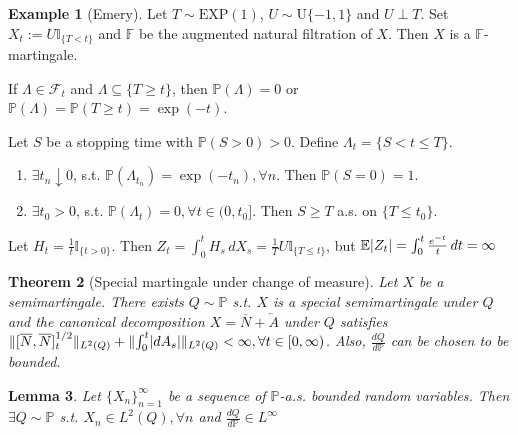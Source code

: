 \documentclass[openany,oneside]{book}
\newtheorem{thm}{Theorem}[section]
\newtheorem{lem}[thm]{Lemma}
\theoremstyle{definition}
\newtheorem{eg}[thm]{Example}
\theoremstyle{remark}
\newcommand{\E}{\mathbb{E}} %
\renewcommand{\P}{\mathbb{P}} %
\newcommand{\I}{\mathbb{I}} %
\DeclarePairedDelimiter{\abs}{\lvert}{\rvert} %
\DeclarePairedDelimiter{\norm}{\lVert}{\rVert} %
\begin{document}
\begin{eg}[Emery]
Let $T\sim \mathrm{EXP}(1)$, $U\sim \mathrm{U}\{-1,1\}$ and $U\perp T$. Set $X_t :=U\I_{\{T< t\}}$ and $\mathbb{F}$ be the augmented natural filtration of $X$. Then $X$ is a $\mathbb{F}$-martingale.
\par
If $\Lambda \in \mathcal{F}_t$ and $\Lambda \subseteq \{T\ge t\}$, then $\P(\Lambda) =0$ or $\P(\Lambda)=\P(T\ge t) = \exp(-t)$.
\par
Let $S$ be a stopping time with $\P(S>0)>0$. Define $\Lambda_t = \{S<t\le T\}$.
\begin{enumerate}
\item $\exists t_n \downarrow 0$, s.t. $\P(\Lambda_{t_n}) = \exp(-t_n), \forall n$. Then $\P(S=0)=1$.
\item $\exists t_0 >0$, s.t. $\P(\Lambda_{t}) = 0, \forall t\in(0,t_0]$. Then $S\ge T$ a.s. on $\{T\le t_0\}$.
\end{enumerate}
\par
Let $H_t = \frac{1}{t}\I_{\{t>0\}}$. Then $Z_t = \int_0^t H_s \,d X_s = \frac{1}{T}U\I_{\{T\le t\}}$, but $\E\abs{Z_t} = \int_0^t \frac{e^{-t}}{t}\,d t = \infty$

\end{eg}

\begin{thm}[Special martingale under change of measure] \label{special}
Let $X$ be a semimartingale. There exists $Q\sim \P$ s.t. $X$ is a special semimartingale under $Q$ and the canonical decomposition $X=\overline{N}+\overleftarrow{A}$ under $Q$ satisfies $\norm{[\overline{N},\overline{N}]_t^{1/2}}_{L^2(Q)} + \norm{\int_0^t\abs{d A_s}}_{L^2(Q)} < \infty, \forall t \in [0,\infty)$. Also, $\frac{d Q}{d\P}$ can be chosen to be bounded.
\end{thm}

\begin{lem}
Let $\{X_n\}_{n=1}^\infty$ be a sequence of $\P$-a.s. bounded random variables. Then $\exists Q\sim \P$ s.t. $X_n \in L^2(Q), \forall n$ and $\frac{d Q}{d\P} \in L^\infty$
\end{lem}
\end{document}
